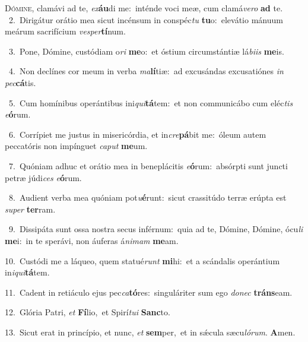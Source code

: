 \lettrine{\initial\textcolor{\initialcolor}{D}}{ómine,} clamávi ad te, \textit{ex}\-\textbf{áu}di me:~\star inténde voci meæ, cum clamá\-\textit{ve}\-\textit{ro} \textbf{ad} te.\\
{\numbfont\textcolor{\numbcolor}{~2.}}~Dirigátur orátio mea sicut incénsum in conspéc\textit{tu} \textbf{tu}\-o:~\star elevátio mánuum meárum sacrifícium \textit{ves}\-\textit{per}\textbf{tí}num.\par
{\numbfont\textcolor{\numbcolor}{~3.}}~Pone, Dómine, custódiam o\textit{ri} \textbf{me}\-o:~\star et óstium circumstántiæ lá\-\textit{bi}\-\textit{is} \textbf{me}\-is.\par
{\numbfont\textcolor{\numbcolor}{~4.}}~Non declínes cor meum in verba \textit{ma}\-\textbf{lí}tiæ:~\star ad excusándas excusatiónes \textit{in} \textit{pec}\-\textbf{cá}tis.\par
{\numbfont\textcolor{\numbcolor}{~5.}}~Cum homínibus operántibus ini\-\textit{qui}\-\textbf{tá}tem:~\star et non communicábo cum eléc\textit{tis} \textit{e}\-\textbf{ó}rum.\par
{\numbfont\textcolor{\numbcolor}{~6.}}~Corrípiet me justus in misericórdia, et in\-\textit{cre}\-\textbf{pá}bit me:~\star óleum autem peccatóris non impínguet \textit{ca}\-\textit{put} \textbf{me}\-um.\par
{\numbfont\textcolor{\numbcolor}{~7.}}~Quóniam adhuc et orátio mea in beneplácitis \textit{e}\-\textbf{ó}rum:~\star absórpti sunt juncti petræ júdi\textit{ces} \textit{e}\-\textbf{ó}rum.\par
{\numbfont\textcolor{\numbcolor}{~8.}}~Audient verba mea quóniam pot\-\textit{u}\-\textbf{é}runt:~\star sicut crassitúdo terræ erúpta est \textit{su}\-\textit{per} \textbf{ter}\-ram.\par
{\numbfont\textcolor{\numbcolor}{~9.}}~Dissipáta sunt ossa nostra secus inférnum:~\dagger quia ad te, Dómine, Dómine, ócu\textit{li} \textbf{me}\-i:~\star in te sperávi, non áuferas á\-\textit{ni}\-\textit{mam} \textbf{me}\-am.\par
{\numbfont\textcolor{\numbcolor}{10.}}~Custódi me a láqueo, quem statué\textit{runt} \textbf{mi}\-hi:~\star et a scándalis operántium in\-\textit{i}\-\textit{qui}\textbf{tá}tem.\par
{\numbfont\textcolor{\numbcolor}{11.}}~Cadent in retiáculo ejus pec\-\textit{ca}\-\textbf{tó}res:~\star singuláriter sum ego \textit{do}\-\textit{nec} \textbf{tráns}\-eam.\par
{\numbfont\textcolor{\numbcolor}{12.}}~Glória Patri, \textit{et} \textbf{Fí}\-lio,~\star et Spirí\-\textit{tu}\-\textit{i} \textbf{Sanc}\-to.\par
{\numbfont\textcolor{\numbcolor}{13.}}~Sicut erat in princípio, et nunc, \textit{et} \textbf{sem}\-per,~\star et in sǽcula sæcu\-\textit{ló}\-\textit{rum}. \textbf{A}\-men.\par
